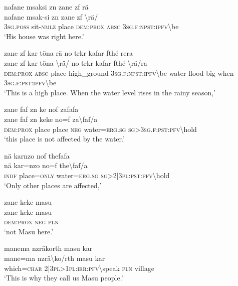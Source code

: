 \ea\label{ex:2:a1662}
nafane msaksi zn zane zf rä\\
\gll nafane	msak-si	zn	zane	zf	{\textbackslash}rä/\\
     3\textsc{sg}.\textsc{poss}	sit-\textsc{nmlz}	place	\textsc{dem}:\textsc{prox}	\textsc{absc}	3\textsc{sg}.\textsc{f}:\textsc{npst}:\textsc{ipfv}{\textbackslash}be\\
\glt `His house was right here.'
\z

\ea\label{ex:2:a1663}
zane zf kar töna rä no trkr kafar fthé rera\\
\gll zane	zf	kar	töna	{\textbackslash}rä/	no	trkr	kafar	fthé	{\textbackslash}rä/ra\\
     \textsc{dem}:\textsc{prox}	\textsc{absc}	place	high\_ground	3\textsc{sg}.\textsc{f}:\textsc{npst}:\textsc{ipfv}{\textbackslash}be	water	flood	big	when	3\textsc{sg}.\textsc{f}:\textsc{pst}:\textsc{ipfv}{\textbackslash}be\\
\glt `This is a high place. When the water level rises in the rainy season,'
\z

\ea\label{ex:2:a1664}
zane faf zn ke nof zafafa\\
\gll zane	faf	zn	keke	no=f	za{\textbackslash}faf/a\\
     \textsc{dem}:\textsc{prox}	place	place	\textsc{neg}	water=\textsc{erg}.\textsc{sg}	\textsc{sg}>3\textsc{sg}.\textsc{f}:\textsc{pst}:\textsc{pfv}{\textbackslash}hold\\
\glt `this place is not affected by the water.'
\z

\ea\label{ex:2:a1665}
nä karnzo nof thefafa\\
\gll nä	kar=nzo	no=f	the{\textbackslash}faf/a\\
     \textsc{indf}	place=\textsc{only}	water=\textsc{erg}.\textsc{sg}	\textsc{sg}>2|3\textsc{pl}:\textsc{pst}:\textsc{pfv}{\textbackslash}hold\\
\glt `Only other places are affected,'
\z

\ea\label{ex:2:a1667}
zane keke masu\\
\gll zane	keke	masu\\
     \textsc{dem}:\textsc{prox}	\textsc{neg}	\textsc{pln}\\
\glt `not Masu here.'
\z

\ea\label{ex:2:a1668}
manema nzräkorth masu kar\\
\gll mane=ma	nzrä{\textbackslash}ko/rth	masu	kar\\
     which=\textsc{char}	2|3\textsc{pl}>1\textsc{pl}:\textsc{irr}:\textsc{pfv}{\textbackslash}speak	\textsc{pln}	village\\
\glt `This is why they call us Masu people.'
\z

